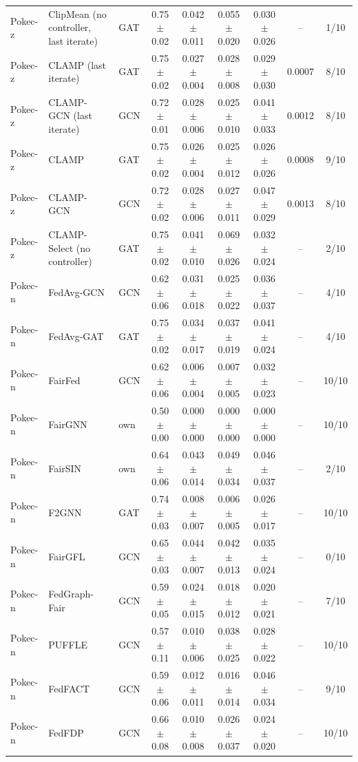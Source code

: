 \begin{longtable}{lp{2.2cm}lcccccc}
Pokec-z & ClipMean (no controller, last iterate) & GAT & 0.75$\pm$0.02 & 0.042$\pm$0.011 & 0.055$\pm$0.020 & 0.030$\pm$0.026 & -- & 1/10 \\
Pokec-z & CLAMP (last iterate) & GAT & 0.75$\pm$0.02 & 0.027$\pm$0.004 & 0.028$\pm$0.008 & 0.029$\pm$0.030 & 0.0007 & 8/10 \\
Pokec-z & CLAMP-GCN (last iterate) & GCN & 0.72$\pm$0.01 & 0.028$\pm$0.006 & 0.025$\pm$0.010 & 0.041$\pm$0.033 & 0.0012 & 8/10 \\
Pokec-z & CLAMP & GAT & 0.75$\pm$0.02 & 0.026$\pm$0.004 & 0.025$\pm$0.012 & 0.026$\pm$0.026 & 0.0008 & 9/10 \\
Pokec-z & CLAMP-GCN & GCN & 0.72$\pm$0.02 & 0.028$\pm$0.006 & 0.027$\pm$0.011 & 0.047$\pm$0.029 & 0.0013 & 8/10 \\
Pokec-z & CLAMP-Select (no controller) & GAT & 0.75$\pm$0.02 & 0.041$\pm$0.010 & 0.069$\pm$0.026 & 0.032$\pm$0.024 & -- & 2/10 \\
Pokec-n & FedAvg-GCN & GCN & 0.62$\pm$0.06 & 0.031$\pm$0.018 & 0.025$\pm$0.022 & 0.036$\pm$0.037 & -- & 4/10 \\
Pokec-n & FedAvg-GAT & GAT & 0.75$\pm$0.02 & 0.034$\pm$0.017 & 0.037$\pm$0.019 & 0.041$\pm$0.024 & -- & 4/10 \\
Pokec-n & FairFed & GCN & 0.62$\pm$0.06 & 0.006$\pm$0.004 & 0.007$\pm$0.005 & 0.032$\pm$0.023 & -- & 10/10 \\
Pokec-n & FairGNN & own & 0.50$\pm$0.00 & 0.000$\pm$0.000 & 0.000$\pm$0.000 & 0.000$\pm$0.000 & -- & 10/10 \\
Pokec-n & FairSIN & own & 0.64$\pm$0.06 & 0.043$\pm$0.014 & 0.049$\pm$0.034 & 0.046$\pm$0.037 & -- & 2/10 \\
Pokec-n & F2GNN & GAT & 0.74$\pm$0.03 & 0.008$\pm$0.007 & 0.006$\pm$0.005 & 0.026$\pm$0.017 & -- & 10/10 \\
Pokec-n & FairGFL & GCN & 0.65$\pm$0.03 & 0.044$\pm$0.007 & 0.042$\pm$0.013 & 0.035$\pm$0.024 & -- & 0/10 \\
Pokec-n & FedGraph-Fair & GCN & 0.59$\pm$0.05 & 0.024$\pm$0.015 & 0.018$\pm$0.012 & 0.020$\pm$0.021 & -- & 7/10 \\
Pokec-n & PUFFLE & GCN & 0.57$\pm$0.11 & 0.010$\pm$0.006 & 0.038$\pm$0.025 & 0.028$\pm$0.022 & -- & 10/10 \\
Pokec-n & FedFACT & GCN & 0.59$\pm$0.06 & 0.012$\pm$0.011 & 0.016$\pm$0.014 & 0.046$\pm$0.034 & -- & 9/10 \\
Pokec-n & FedFDP & GCN & 0.66$\pm$0.08 & 0.010$\pm$0.008 & 0.026$\pm$0.037 & 0.024$\pm$0.020 & -- & 10/10 \\

\end{longtable}
